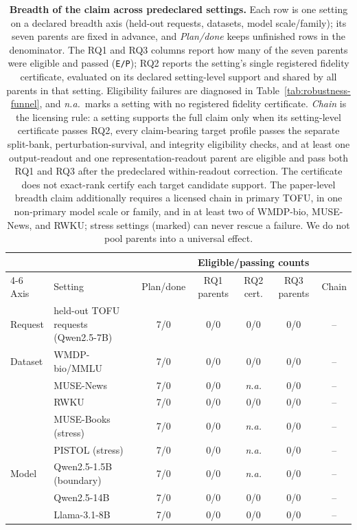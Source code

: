 \begin{table}[!t]
  \caption{\textbf{Breadth of the claim across predeclared settings.} Each
  row is one setting on a declared breadth axis (held-out requests, datasets,
  model scale/family); its seven parents are fixed in advance, and
  \emph{Plan/done} keeps unfinished rows in the denominator. The RQ1 and RQ3
  columns report how many of the seven parents were eligible and passed
  (\texttt{E/P}); RQ2 reports the setting's single registered fidelity
  certificate, evaluated on its declared setting-level support and shared by
  all parents in that setting.
  Eligibility failures are diagnosed in
  Table~\ref{tab:robustness-funnel}, and \textit{n.a.}\ marks a setting with
  no registered fidelity certificate. \emph{Chain} is the licensing rule: a
  setting supports the full claim only when its setting-level certificate
  passes RQ2, every claim-bearing target profile passes the separate
  split-bank, perturbation-survival, and integrity eligibility checks, and at
  least one output-readout and one representation-readout parent are eligible
  and pass both RQ1 and RQ3 after the predeclared within-readout correction.
  The certificate does not exact-rank certify each target candidate support.
  The paper-level breadth claim
  additionally requires a licensed chain in primary TOFU, in one non-primary
  model scale or family, and in at least two of WMDP-bio, MUSE-News, and
  RWKU; stress settings (marked) can never rescue a failure. We do not pool
  parents into a universal effect.}
  \label{tab:robustness}
  \centering
  \small
  \setlength{\tabcolsep}{5pt}
  \begin{tabular}{@{}llccccc@{}}
    \toprule
    & & & \multicolumn{3}{c}{Eligible/passing counts} & \\
    \cmidrule(lr){4-6}
    Axis & Setting
      & Plan/done
      & RQ1 parents
      & RQ2 cert.
      & RQ3 parents
      & Chain \\
    \midrule
    Request & held-out TOFU requests (Qwen2.5-7B) & 7/0 & 0/0 & 0/0 & 0/0 & -- \\
    \addlinespace[2pt]
    Dataset & WMDP-bio/MMLU        & 7/0 & 0/0 & 0/0 & 0/0 & -- \\
            & MUSE-News            & 7/0 & 0/0 & \textit{n.a.} & 0/0 & -- \\
            & RWKU                 & 7/0 & 0/0 & 0/0 & 0/0 & -- \\
            & MUSE-Books (stress)  & 7/0 & 0/0 & \textit{n.a.} & 0/0 & -- \\
            & PISTOL (stress)      & 7/0 & 0/0 & \textit{n.a.} & 0/0 & -- \\
    \addlinespace[2pt]
    Model   & Qwen2.5-1.5B (boundary) & 7/0 & 0/0 & \textit{n.a.} & 0/0 & -- \\
            & Qwen2.5-14B          & 7/0 & 0/0 & 0/0 & 0/0 & -- \\
            & Llama-3.1-8B         & 7/0 & 0/0 & 0/0 & 0/0 & -- \\
    \bottomrule
  \end{tabular}
\end{table}


